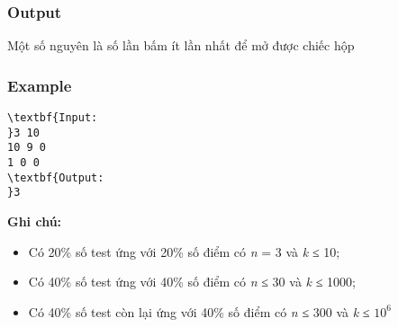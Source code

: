\subsubsection{Output}

Một số nguyên là số lần bấm ít lần nhất để mở được chiếc hộp

\subsubsection{Example}
\begin{verbatim}
\textbf{Input:
}3 10
10 9 0
1 0 0
\textbf{Output:
}3
\end{verbatim}

\textbf{\textbf{Ghi chú:}}
\begin{itemize}
	\item Có 20\% số test ứng với 20\% số điểm có \emph{n }= 3 và \emph{k} ≤ 10;
	\item Có 40\% số test ứng với 40\% số điểm có \emph{n }≤ 30 và \emph{k} ≤ 1000;
	\item Có 40\% số test còn lại ứng với 40\% số điểm có \emph{n }≤ 300 và \emph{k} ≤ $10^{6}$
\end{itemize}
